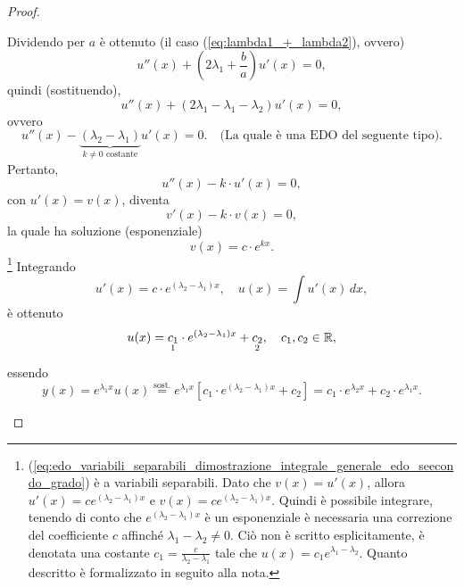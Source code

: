 \begin{proof}
\begin{enumerate}
		\noindent Dividendo per $a$ è ottenuto (il caso (\ref{eq:lambda1_+_lambda2}), ovvero)
		\begin{equation*}
			u''(x)+\left(2\lambda_1+\frac{b}{a}\right)u'(x)=0,
		\end{equation*}
		quindi (sostituendo),
		\begin{equation*}
			u''(x) + (2\lambda_1 -\lambda_1-\lambda_2) u'(x) = 0,
		\end{equation*}
		ovvero
		\begin{equation*}
			u''(x) - \underbrace{(\lambda_2-\lambda_1)}_{k\neq 0\text{ costante}} u'(x) = 0.\quad\text{(La quale è una EDO del seguente tipo)}.
		\end{equation*}
		Pertanto,
		\begin{equation*}
			u''(x)- k\cdot u'(x) = 0,
		\end{equation*}
		con $u'(x)=v(x)$, diventa
		\begin{equation}\label{eq:edo_variabili_separabili_dimostrazione_integrale_generale_edo_seecondo_grado}
			v'(x) - k \cdot v(x)=0,
		\end{equation}
		la quale ha soluzione (esponenziale)
		\begin{equation*}
			v(x) = c \cdot e^{kx}.
		\end{equation*}
		\footnote{(\ref{eq:edo_variabili_separabili_dimostrazione_integrale_generale_edo_seecondo_grado}) è a variabili separabili. Dato che $v(x)=u'(x)$, allora $u'(x)=ce^{(\lambda_2-\lambda_1)x}$ e $v(x)=ce^{(\lambda_2-\lambda_1)x}$. Quindi è possibile integrare, tenendo di conto che $e^{(\lambda_2-\lambda_1)x}$ è un esponenziale è necessaria una correzione del coefficiente $c$ affinché $\lambda_1-\lambda_2\neq 0$. Ciò non è scritto esplicitamente, è denotata una costante $c_1=\frac{c}{\lambda_2-\lambda_1}$ tale che $u(x) = c_1 e^{\lambda_1-\lambda_2}$. Quanto descritto è formalizzato in seguito alla nota.} Integrando
		\begin{equation*}
			u'(x)=c\cdot e^{(\lambda_2-\lambda_1)x},\quad u(x)=\int u'(x)\,dx,
		\end{equation*}
		è ottenuto
		\begin{equation*}
			u(x)=\underset{\footnotemark}{c_1}\cdot e^{(\lambda_2-\lambda_1)x}+\underset{\footnotemark}{c_2},\quad c_1,c_2\in\mathbb{R},
		\end{equation*}
		essendo
		\begin{equation*}
			y(x)=e^{\lambda_1 x}u(x)\overset{\text{sost.}}{=}e^{\lambda_1x}\left[c_1\cdot e^{(\lambda_2-\lambda_1)x}+c_2\right] = c_1\cdot e^{\lambda_2 x} + c_2\cdot e^{\lambda_1 x}.
		\end{equation*}
		

\end{enumerate}
\end{proof}
